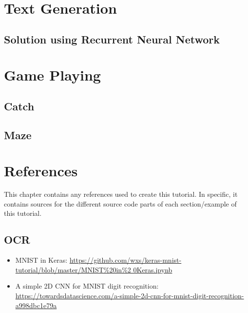 \documentclass[10pt,twoside,a4paper,openany]{memoir}
\renewcommand*{\printchaptertitle}[1]{\chaptitlefont\thechapter.\ ##1}
\begin{document}
\chapter{Text Generation}
\section{Solution using Recurrent Neural Network}


\chapter{Game Playing}
\section{Catch}


\section{Maze}


\backmatter

\renewcommand*{\printchaptertitle}[1]{\chaptitlefont#1}
\chapter*{References}
This chapter contains any references used to create this tutorial.
In specific, it contains sources for the different source
code parts of each section/example of this tutorial.

\section{OCR}
\begin{itemize}
\item MNIST in Keras: \href{https://github.com/wxs/keras-mnist-tutorial/blob/master/MNIST\%20in\%20Keras.ipynb}{https://github.com/wxs/keras-mnist-tutorial/blob/master/MNIST\%20in\%2 0Keras.ipynb}
\item A simple 2D CNN for MNIST digit recognition: \href{https://towardsdatascience.com/a-simple-2d-cnn-for-mnist-digit-recognition-a998dbc1e79a}{https://towardsdatascience.com/a-simple-2d-cnn-for-mnist-digit-recognition-a998dbc1e79a}
\end{itemize}
\end{document}
